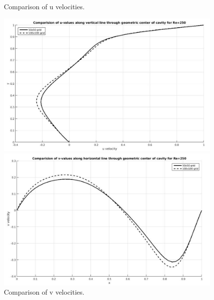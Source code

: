 \documentclass[12pt]{elsarticle}
\begin{document}
	\begin{figure}[h]
		\caption{Comparison of u velocities.}
		\centering\includegraphics[width=1.0\linewidth]{33_uvel_mesh_re_250_comparision}
		\caption{Comparison of v velocities.}
		\centering\includegraphics[width=1.0\linewidth]{34_vvel_mesh_re_250_comparision}
	\end{figure}
	
\end{document}
